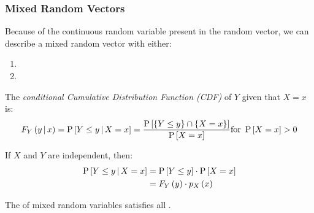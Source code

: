 \subsubsection{Mixed Random Vectors}\label{subsubsec:Conditional Probability Mixed Random Vectors}
Because of the continuous random variable present in the random vector, we can describe a mixed random vector with either:
\begin{enumerate}
\item {}
\item {}
\end{enumerate}
\begin{definition}\label{def:Mixed Random Vector-Conditional CDF}
  The \emph{conditional Cumulative Distribution Function (CDF)} of $Y$ given that $X = x$ is:
  \begin{equation}\label{eq:Mixed Random Vector-Conditional CDF}
    F_{Y} \left( y \operatorname{\vert} x \right) = \operatorname{\operatorname{P}} \left[ Y \leq y \operatorname{\vert} X=x \right] = \frac{\operatorname{\operatorname{P}} \left[ \lbrace Y \leq y \rbrace \cap \lbrace X = x \rbrace \right]}{\operatorname{\operatorname{P}} \left[ X = x \right]} \text{for } \operatorname{\operatorname{P}} \left[ X = x \right] >0
  \end{equation}
  \begin{remark}
    If $X$ and $Y$ are independent, then:
    \begin{equation}\label{eq: Mixed Random Vector-Independent-Conditional CDF}
      \begin{aligned}
        \operatorname{\operatorname{P}} \left[ Y \leq y \operatorname{\vert} X=x \right] &= \operatorname{\operatorname{P}} \left[ Y \leq y \right] \cdot \operatorname{\operatorname{P}} \left[ X = x \right] \\
        &= F_{Y} \left( y \right) \cdot p_{X} \left( x \right)
      \end{aligned}
    \end{equation}
  \end{remark}
  \begin{remark}
    The  of mixed random variables satisfies all .
  \end{remark}
\end{definition}
